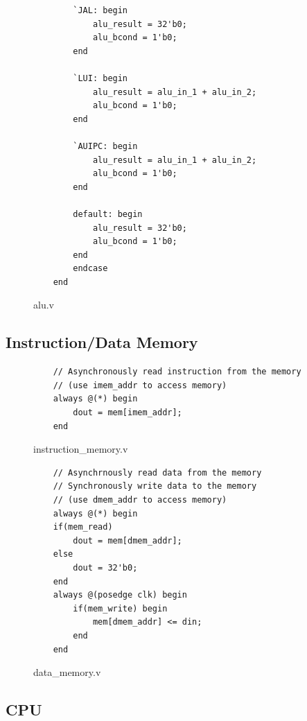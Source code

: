 \documentclass[openright, a4paper]{article}
\begin{document}
\begin{figure}[!h]
    \begin{verbatim}
        `JAL: begin
            alu_result = 32'b0;
            alu_bcond = 1'b0;
        end

        `LUI: begin
            alu_result = alu_in_1 + alu_in_2;
            alu_bcond = 1'b0;
        end

        `AUIPC: begin
            alu_result = alu_in_1 + alu_in_2;
            alu_bcond = 1'b0;
        end

        default: begin
            alu_result = 32'b0;
            alu_bcond = 1'b0;
        end
        endcase
    end
    \end{verbatim}
    \caption{alu.v}
\end{figure}

\subsection{Instruction/Data Memory}

\begin{figure}[!h]
    \begin{verbatim}
    // Asynchronously read instruction from the memory 
    // (use imem_addr to access memory)
    always @(*) begin
        dout = mem[imem_addr];
    end
    \end{verbatim}
    \caption{instruction_memory.v}
\end{figure}

\hfill \break
\begin{figure}[!h]
    \begin{verbatim}
    // Asynchrnously read data from the memory
    // Synchronously write data to the memory
    // (use dmem_addr to access memory)
    always @(*) begin
    if(mem_read)
        dout = mem[dmem_addr];
    else
        dout = 32'b0;
    end
    always @(posedge clk) begin
        if(mem_write) begin
            mem[dmem_addr] <= din;
        end
    end
    \end{verbatim}
    \caption{data_memory.v}
\end{figure}

\subsection{CPU}
\end{document}
